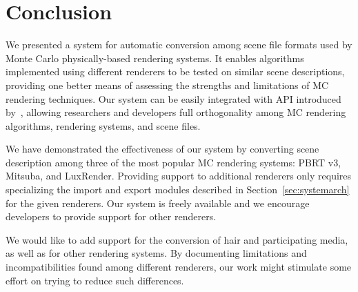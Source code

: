 \section{Conclusion}
\label{sec:conclusion}
We presented a system for automatic conversion among scene file formats used by Monte Carlo physically-based rendering systems. 
It enables algorithms implemented using different renderers to be tested on similar scene descriptions, providing one better means of assessing the strengths and limitations of MC rendering techniques. 
%
Our system can be easily integrated with API introduced by~\cite{Santos:2018:FBKSD}, allowing researchers and developers full orthogonality among MC rendering algorithms, rendering systems, and scene files.   

We have demonstrated the effectiveness of our system by converting scene description among three of the most popular MC rendering systems: PBRT v3, Mitsuba, and LuxRender. Providing support to additional renderers only requires specializing the import and export modules described in Section~\ref{sec:systemarch} for the given renderers. Our system is freely available and we encourage developers to provide support for other renderers.  

We would like to add support for the conversion of hair and participating media, as well as for other rendering systems.
By documenting limitations and incompatibilities found among different renderers, our work might stimulate some effort on trying to reduce such differences.   
